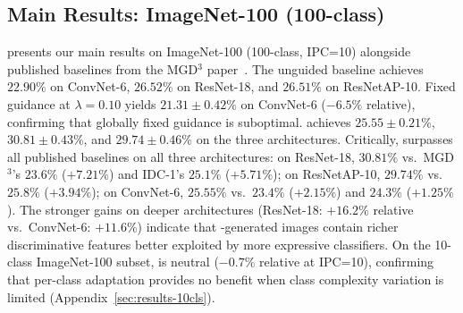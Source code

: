 \subsection{Main Results: ImageNet-100 (100-class)}
\label{sec:results-100cls}

 presents our main results on ImageNet-100 (100-class, IPC=10) alongside published baselines from the MGD$^3$ paper~\cite{chansantiago2025modeguided}. The unguided baseline achieves $22.90\%$ on ConvNet-6, $26.52\%$ on ResNet-18, and $26.51\%$ on ResNetAP-10. Fixed guidance at $\lambda = 0.10$ yields $21.31 \pm 0.42\%$ on ConvNet-6 ($-6.5\%$ relative), confirming that globally fixed guidance is suboptimal. \cags{} achieves $25.55 \pm 0.21\%$, $30.81 \pm 0.43\%$, and $29.74 \pm 0.46\%$ on the three architectures. Critically, \cags{} surpasses all published baselines on all three architectures: on ResNet-18, $30.81\%$ vs.\ MGD$^3$'s $23.6\%$ ($+7.21\%$) and IDC-1's $25.1\%$ ($+5.71\%$); on ResNetAP-10, $29.74\%$ vs.\ $25.8\%$ ($+3.94\%$); on ConvNet-6, $25.55\%$ vs.\ $23.4\%$ ($+2.15\%$) and $24.3\%$ ($+1.25\%$). The stronger gains on deeper architectures (ResNet-18: $+16.2\%$ relative vs.\ ConvNet-6: $+11.6\%$) indicate that \cags{}-generated images contain richer discriminative features better exploited by more expressive classifiers. On the 10-class ImageNet-100 subset, \cags{} is neutral ($-0.7\%$ relative at IPC=10), confirming that per-class adaptation provides no benefit when class complexity variation is limited (Appendix~\ref{sec:results-10cls}).

